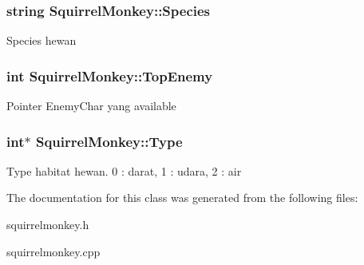 \subsubsection[{\texorpdfstring{Species}{Species}}]{\setlength{\rightskip}{0pt plus 5cm}string Squirrel\+Monkey\+::\+Species\hspace{0.3cm}{\ttfamily [protected]}}\hypertarget{class_squirrel_monkey_a2d5a588234e73bb6a7314bde566df5e4}{}\label{class_squirrel_monkey_a2d5a588234e73bb6a7314bde566df5e4}
Species hewan 
\subsubsection[{\texorpdfstring{Top\+Enemy}{TopEnemy}}]{\setlength{\rightskip}{0pt plus 5cm}int Squirrel\+Monkey\+::\+Top\+Enemy\hspace{0.3cm}{\ttfamily [protected]}}\hypertarget{class_squirrel_monkey_a68bf6d84b4b0c03126fa172339c80754}{}\label{class_squirrel_monkey_a68bf6d84b4b0c03126fa172339c80754}
Pointer Enemy\+Char yang available 
\subsubsection[{\texorpdfstring{Type}{Type}}]{\setlength{\rightskip}{0pt plus 5cm}int$\ast$ Squirrel\+Monkey\+::\+Type\hspace{0.3cm}{\ttfamily [protected]}}\hypertarget{class_squirrel_monkey_a976f90af80d2665bd2f30340ebc2f8ca}{}\label{class_squirrel_monkey_a976f90af80d2665bd2f30340ebc2f8ca}
Type habitat hewan. 0 \+: darat, 1 \+: udara, 2 \+: air 

The documentation for this class was generated from the following files\+:\begin{DoxyCompactItemize}
\item 
squirrelmonkey.\+h\item 
squirrelmonkey.\+cpp\end{DoxyCompactItemize}
